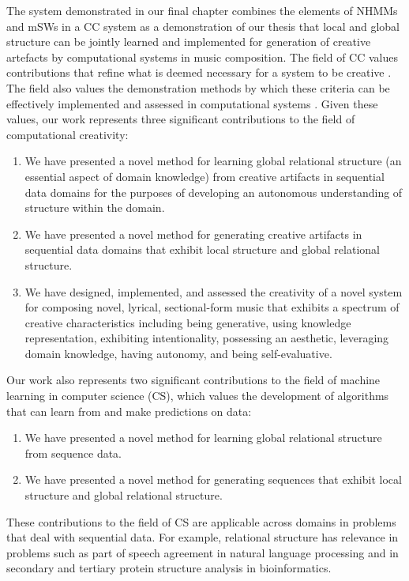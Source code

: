 \documentclass[phd,electronic,oneside,twosidetoc,letterpaper,chaptercenter,parttop,lof,lot]{byumsphd}
\begin{document}
The system demonstrated in our final chapter combines the elements of NHMMs and mSWs in a CC system as a demonstration of our thesis that local and global structure can be jointly learned and implemented for generation of creative artefacts by computational systems in music composition. The field of CC values contributions that refine what is deemed necessary for a system to be creative \cite{colton2015stakeholder}. The field also values the demonstration methods by which these criteria can be effectively implemented and assessed in computational systems \cite{Jordanous2014}. Given these values, our work represents three significant contributions to the field of computational creativity:
\begin{enumerate}
\item We have presented a novel method for learning global relational structure (an essential aspect of domain knowledge) from creative artifacts in sequential data domains for the purposes of developing an autonomous understanding of structure within the domain.
\item We have presented a novel method for generating creative artifacts in sequential data domains that exhibit local structure and global relational structure.
\item We have designed, implemented, and assessed the creativity of a novel system for composing novel, lyrical, sectional-form music that exhibits a spectrum of creative characteristics including being generative, using knowledge representation, exhibiting intentionality, possessing an aesthetic, leveraging domain knowledge, having autonomy, and being self-evaluative.
\end{enumerate}

Our work also represents two significant contributions to the field of machine learning in computer science (CS), which values the development of algorithms that can learn from and make predictions on data:
\begin{enumerate}
\item We have presented a novel method for learning global relational structure from sequence data.
\item We have presented a novel method for generating sequences that exhibit local structure and global relational structure.
\end{enumerate}

These contributions to the field of CS are applicable across domains in problems that deal with sequential data. For example, relational structure has relevance in problems such as part of speech agreement in natural language processing and in secondary and tertiary protein structure analysis in bioinformatics.
\end{document}
